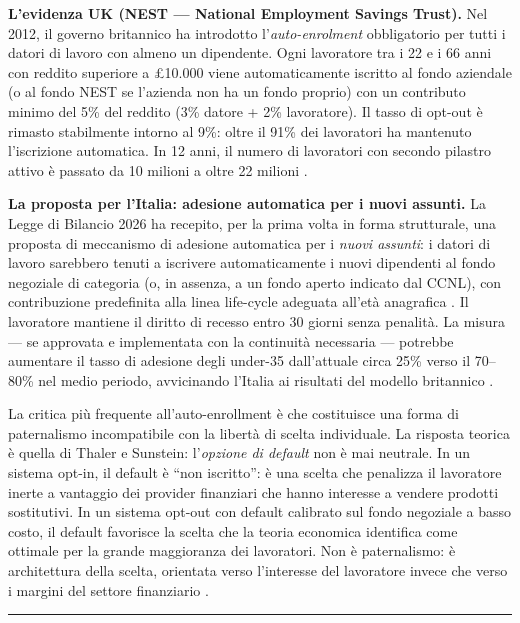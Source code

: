 \medskip
\noindent
\textbf{L'evidenza UK (NEST — National Employment Savings Trust).}
Nel 2012, il governo britannico ha introdotto l'\emph{auto-enrolment}
obbligatorio per tutti i datori di lavoro con almeno un dipendente.
Ogni lavoratore tra i 22 e i 66 anni con reddito superiore a
£10.000 viene automaticamente iscritto al fondo aziendale (o al
fondo NEST se l'azienda non ha un fondo proprio) con un contributo
minimo del 5\% del reddito (3\% datore + 2\% lavoratore).
Il tasso di opt-out è rimasto stabilmente intorno al 9\%:
oltre il 91\% dei lavoratori ha mantenuto l'iscrizione automatica.
In 12 anni, il numero di lavoratori con secondo pilastro attivo
è passato da 10 milioni a oltre 22 milioni \cite{Lavoce2024a, Fornero2018}.

\medskip
\noindent
\textbf{La proposta per l'Italia: adesione automatica per i nuovi assunti.}
La Legge di Bilancio 2026 ha recepito, per la prima volta in forma
strutturale, una proposta di meccanismo di adesione automatica per i
\emph{nuovi assunti}: i datori di lavoro sarebbero tenuti a iscrivere
automaticamente i nuovi dipendenti al fondo negoziale di categoria
(o, in assenza, a un fondo aperto indicato dal CCNL), con contribuzione
predefinita alla linea life-cycle adeguata all'età anagrafica
\cite{web:70, web:73}.
Il lavoratore mantiene il diritto di recesso entro 30 giorni senza
penalità.
La misura — se approvata e implementata con la continuità necessaria —
potrebbe aumentare il tasso di adesione degli under-35 dall'attuale
circa 25\% verso il 70--80\% nel medio periodo, avvicinando l'Italia
ai risultati del modello britannico \cite{web:80, COVIP2025}.

\medskip
\noindent
La critica più frequente all'auto-enrollment è che costituisce
una forma di paternalismo incompatibile con la libertà di scelta
individuale.
La risposta teorica è quella di Thaler e Sunstein: l'\emph{opzione
di default} non è mai neutrale.
In un sistema opt-in, il default è ``non iscritto'': è una scelta
che penalizza il lavoratore inerte a vantaggio dei provider
finanziari che hanno interesse a vendere prodotti sostitutivi.
In un sistema opt-out con default calibrato sul fondo negoziale
a basso costo, il default favorisce la scelta che la teoria
economica identifica come ottimale per la grande maggioranza
dei lavoratori.
Non è paternalismo: è architettura della scelta, orientata
verso l'interesse del lavoratore invece che verso i margini
del settore finanziario \cite{Lavoce2024a, Bosi2018}.

\bigskip
\noindent\rule{\textwidth}{0.4pt}

